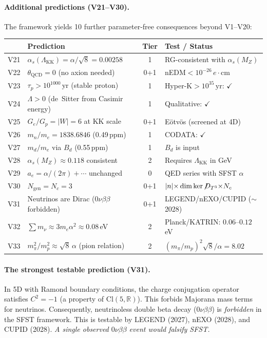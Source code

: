 \documentclass[11pt,a4paper]{article}
\theoremstyle{definition}
\theoremstyle{remark}
\begin{document}
\paragraph{Additional predictions (V21--V30).}
The framework yields 10 further parameter-free consequences beyond V1--V20:
\begin{center}
\renewcommand{\arraystretch}{1.15}\footnotesize
\begin{tabular}{clcl}
\toprule
& \textbf{Prediction} & \textbf{Tier} & \textbf{Test / Status}\\
\midrule
V21 & $\alpha_s(\Lambda_{\mathrm{KK}})=\alpha/\!\sqrt{8}=0.00258$ & 1 & RG-consistent with $\alpha_s(M_Z)$\\
V22 & $\theta_{\mathrm{QCD}}=0$ (no axion needed) & 0{+}1 & nEDM${<}10^{-26}\,e{\cdot}\mathrm{cm}$\\
V23 & $\tau_p>10^{1000}\,\mathrm{yr}$ (stable proton) & 1 & Hyper-K${>}10^{35}\,\mathrm{yr}$: $\checkmark$\\
V24 & $\Lambda>0$ (de~Sitter from Casimir energy) & 1 & Qualitative: $\checkmark$\\
V25 & $G_e/G_p=|W|=6$ at KK scale & 0{+}1 & E\"otv\"os (screened at 4D)\\
V26 & $m_n/m_e=1838.6846$ (0.49\,ppm) & 1 & CODATA: $\checkmark$\\
V27 & $m_d/m_e$ via $B_d$ (0.55\,ppm) & 1 & $B_d$ is input\\
V28 & $\alpha_s(M_Z)\approx 0.118$ consistent & 2 & Requires $\Lambda_{\mathrm{KK}}$ in GeV\\
V29 & $a_e=\alpha/(2\pi)+\cdots$ unchanged & 0 & QED series with SFST $\alpha$\\
V30 & $N_{\mathrm{gen}}=N_c=3$ & 0{+}1 & $|n|{\times}\dim\ker\!\not\!D_{T^3}{\times}N_c$\\
\midrule
V31 & Neutrinos are Dirac ($0\nu\beta\beta$ forbidden) & 0{+}1 &
  LEGEND/nEXO/CUPID (${\sim}$2028)\\
V32 & $\sum m_\nu \approx 3m_e\alpha^2 \approx 0.08\,$eV & 2 &
  Planck/KATRIN: $0.06$--$0.12\,$eV\\
V33 & $m_\pi^2/m_p^2 \approx \sqrt{8}\,\alpha$ (pion relation) & 2 &
  $(m_\pi/m_p)^2\sqrt{8}/\alpha = 8.02$\\
\bottomrule
\end{tabular}
\end{center}

\paragraph{The strongest testable prediction (V31).}
In 5D with Ramond boundary conditions, the charge conjugation operator
satisfies $C^2=-1$ (a property of $\mathrm{Cl}(5,\mathbb{R})$).
This forbids Majorana mass terms for neutrinos.
Consequently, neutrinoless double beta decay ($0\nu\beta\beta$)
is \emph{forbidden} in the SFST framework.  This is testable by
LEGEND (2027), nEXO (2028), and CUPID (2028).
\emph{A single observed $0\nu\beta\beta$ event would falsify SFST.}
\end{document}
